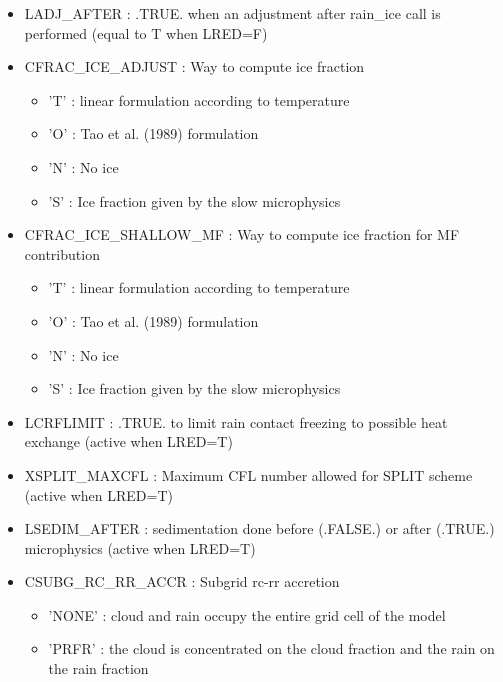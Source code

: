 \begin{itemize}
\item 
LADJ\_AFTER  : .TRUE. when an adjustment after rain\_ice call is performed (equal to T when LRED=F)

\item 
CFRAC\_ICE\_ADJUST   : Way to compute ice fraction 
\begin{itemize}
\item{'T'} : linear formulation according to temperature
\item{'O'} : Tao et al. (1989) formulation
\item{'N'} : No ice
\item{'S'} : Ice fraction given by the slow microphysics
\end{itemize}

\item 
CFRAC\_ICE\_SHALLOW\_MF : Way to compute ice fraction for MF contribution
\begin{itemize}
\item{'T'} : linear formulation according to temperature
\item{'O'} : Tao et al. (1989) formulation
\item{'N'} : No ice
\item{'S'} : Ice fraction given by the slow microphysics
\end{itemize}

\item 
LCRFLIMIT  : .TRUE. to limit rain contact freezing to possible heat exchange (active when LRED=T)

\item 
XSPLIT\_MAXCFL : Maximum CFL number allowed for SPLIT scheme (active when LRED=T)

\item 
LSEDIM\_AFTER  : sedimentation done before (.FALSE.) or after (.TRUE.) microphysics (active when LRED=T)

\item
CSUBG\_RC\_RR\_ACCR :
Subgrid rc-rr accretion
\begin{itemize}
\item{'NONE'} : cloud and rain occupy the entire grid cell of the model
\item{'PRFR'} : the cloud is concentrated on the cloud fraction and the rain on the rain fraction
\end{itemize}


\end{itemize}
